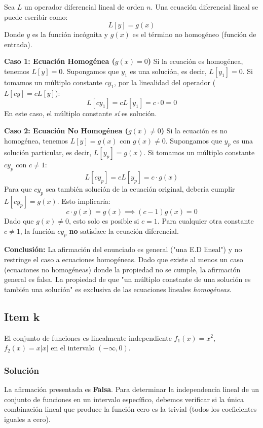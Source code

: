 \documentclass[a4paper]{article}
\begin{document}
Sea $L$ un operador diferencial lineal de orden $n$. Una ecuación diferencial lineal se puede escribir como:
$$
L[y] = g(x)
$$
Donde $y$ es la función incógnita y $g(x)$ es el término no homogéneo (función de entrada).

\textbf{Caso 1: Ecuación Homogénea ($g(x) = 0$)}
Si la ecuación es homogénea, tenemos $L[y] = 0$. Supongamos que $y_1$ es una solución, es decir, $L[y_1] = 0$. Si tomamos un múltiplo constante $c y_1$, por la linealidad del operador ($L[cy] = cL[y]$):
$$
L[c y_1] = c L[y_1] = c \cdot 0 = 0
$$
En este caso, el múltiplo constante \textit{sí} es solución.

\textbf{Caso 2: Ecuación No Homogénea ($g(x) \neq 0$)}
Si la ecuación es no homogénea, tenemos $L[y] = g(x)$ con $g(x) \neq 0$. Supongamos que $y_p$ es una solución particular, es decir, $L[y_p] = g(x)$. Si tomamos un múltiplo constante $c y_p$ con $c \neq 1$:
$$
L[c y_p] = c L[y_p] = c \cdot g(x)
$$
Para que $c y_p$ sea también solución de la ecuación original, debería cumplir $L[c y_p] = g(x)$. Esto implicaría:
$$
c \cdot g(x) = g(x) \implies (c - 1)g(x) = 0
$$
Dado que $g(x) \neq 0$, esto solo es posible si $c = 1$. Para cualquier otra constante $c \neq 1$, la función $c y_p$ \textbf{no} satisface la ecuación diferencial.

\textbf{Conclusión:}
La afirmación del enunciado es general ("una E.D lineal") y no restringe el caso a ecuaciones homogéneas. Dado que existe al menos un caso (ecuaciones no homogéneas) donde la propiedad no se cumple, la afirmación general es falsa. La propiedad de que "un múltiplo constante de una solución es también una solución" es exclusiva de las ecuaciones lineales \textit{homogéneas}.

\subsection{Item k}
El conjunto de funciones es linealmente independiente $f_1(x)= x^2$, $f_2(x)= x|x|$ en el intervalo $(-\infty, 0)$.

\subsubsection{Solución}
La afirmación presentada es \textbf{Falsa}. Para determinar la independencia lineal de un conjunto de funciones en un intervalo específico, debemos verificar si la única combinación lineal que produce la función cero es la trivial (todos los coeficientes iguales a cero).
\end{document}
